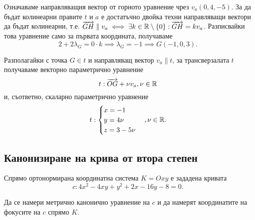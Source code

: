\documentclass[numbers=endperiod, DIV=15]{scrartcl}
\begin{document}
\begin{solution}
\begin{enumerate}[label=\alph*)]
    Означаваме направляващия вектор от горното уравнение чрез $v_a(0, 4, -5)$. За да бъдат колинеарни правите $t$ и $a$ е достатъчно двойка техни направляващи вектори да бъдат колинеарни, т.е. $\overrightarrow{GH} \parallel v_a \iff \exists k \in \mathbb{R} \setminus \{ 0 \} : \overrightarrow{GH} = k v_a$. Разписвайки това уравнение само за първата координата, получаваме
    \begin{displaymath}
      2 + 2\lambda_G = 0 \cdot k \implies \lambda_G = -1 \implies G(-1, 0, 3).
    \end{displaymath}

    Разполагайки с точка $G \in t$ и направляващ вектор $v_a \parallel t$, за трансверзалата $t$ получаваме векторно параметрично уравнение
    \begin{displaymath}
      t: \overrightarrow{OG} + \nu v_a, \nu \in \mathbb{R}
    \end{displaymath}
    и, съответно, скаларно параметрично уравнение
    \begin{displaymath}
      t: \begin{cases}
        x = -1 \\
        y = 4\nu \\
        z = 3 - 5\nu
      \end{cases},
      \nu \in \mathbb{R}.
    \end{displaymath}
  \end{enumerate}
\end{solution}

\subsection{Канонизиране на крива от втора степен}

\begin{exercise}
  Спрямо ортонормирана координатна система $K = Oxy$ е зададена кривата
  \begin{displaymath}
    c: 4x^2 - 4xy + y^2 + 2x - 16y - 8 = 0.
  \end{displaymath}

  Да се намери метрично канонично уравнение на $c$ и да намерят координатите на фокусите на $c$ спрямо $K$.
\end{exercise}
\end{document}
